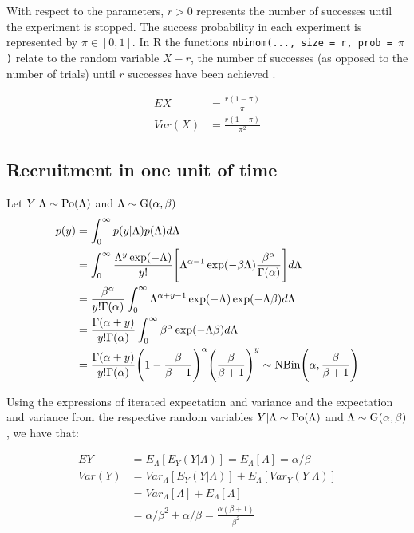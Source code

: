 With respect to the parameters, $r>0$ represents the number of successes until 
the experiment is stopped. The success probability in each experiment is 
represented by $\pi\in[0,1]$.  In R the functions \texttt{nbinom(..., size = r, prob = $\pi$)} relate to the random variable $X-r$, the number of successes (as opposed to the number of trials) until $r$ successes have been achieved \citep{held2014applied}. 

\begin{align*}
EX & = \frac{r(1-\pi)}{\pi}\\
Var(X) & = \frac{r(1-\pi)}{\pi^2}
\end{align*}


\subsection{Recruitment in one unit of time}
Let $Y|\Lambda \sim \rm{Po}(\Lambda)$ and $\Lambda \sim \rm{G}(\alpha,\beta)$
\begin{align*}
p(y)&=\int^\infty_0 p(y|\Lambda) p(\Lambda) d\Lambda\\
&=\int^\infty_0 \frac{\Lambda^y\exp(-\Lambda)}{y!}\Bigg[\Lambda^{\alpha-1}\exp(-\beta\Lambda)\frac{\beta^\alpha}{\Gamma(\alpha)}\Bigg]d\Lambda\\
&=\frac{\beta^\alpha}{y!\Gamma(\alpha)}\int^\infty_0 \Lambda^{\alpha+y-1}\exp(-\Lambda)\exp(-\Lambda\beta)d\Lambda\\
&=\frac{\Gamma(\alpha+y)}{y!\Gamma(\alpha)}\int^\infty_0 \beta^\alpha \exp(-\Lambda\beta)d\Lambda\\
&=\frac{\Gamma(\alpha+y)}{y!\Gamma(\alpha)}\Bigg(1-\frac{\beta}{\beta+1}\Bigg)^{\alpha}\Bigg(\frac{\beta}{\beta+1}\Bigg)^y \sim \rm{NBin} \Bigg(\alpha, \frac{\beta}{\beta+1}\Bigg)
\end{align*}
\newpage

Using the expressions of iterated expectation and variance \citep{held2014applied} and the expectation and variance from the respective random variables $Y|\Lambda \sim \rm{Po}(\Lambda)$ and $\Lambda \sim \rm{G}(\alpha,\beta)$, we have that:

\begin{align*}
EY &= E_{\Lambda}[E_{Y} (Y|\Lambda)] = E_{\Lambda}[\Lambda] = \alpha/\beta \\
Var(Y) &= Var_{\Lambda}[E_{Y} (Y|\Lambda)] + E_{\Lambda}[Var_Y(Y|\Lambda)]\\
&=Var_{\Lambda}[\Lambda] + E_{\Lambda}[\Lambda] \\
&=\alpha/\beta^2 + \alpha/\beta = \frac{\alpha(\beta+1)}{\beta^2}
\end{align*}

